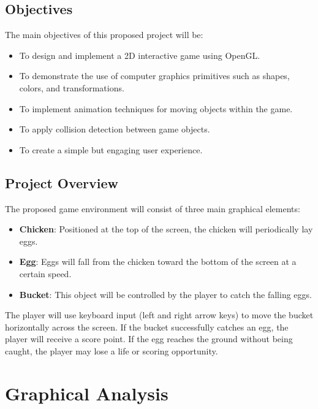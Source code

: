 \documentclass[12pt]{article}
\begin{document}
\subsection{Objectives}

The main objectives of this proposed project will be:

\begin{itemize}
\item To design and implement a 2D interactive game using OpenGL.
\item To demonstrate the use of computer graphics primitives such as shapes, colors, and transformations.
\item To implement animation techniques for moving objects within the game.
\item To apply collision detection between game objects.
\item To create a simple but engaging user experience.
\end{itemize}

\subsection{Project Overview}

The proposed game environment will consist of three main graphical elements:

\begin{itemize}
\item \textbf{Chicken}: Positioned at the top of the screen, the chicken will periodically lay eggs.
\item \textbf{Egg}: Eggs will fall from the chicken toward the bottom of the screen at a certain speed.
\item \textbf{Bucket}: This object will be controlled by the player to catch the falling eggs.\\
\end{itemize}
The player will use keyboard input (left and right arrow keys) to move the bucket horizontally across the screen. If the bucket successfully catches an egg, the player will receive a score point. If the egg reaches the ground without being caught, the player may lose a life or scoring opportunity.


\section{Graphical Analysis}
\end{document}
